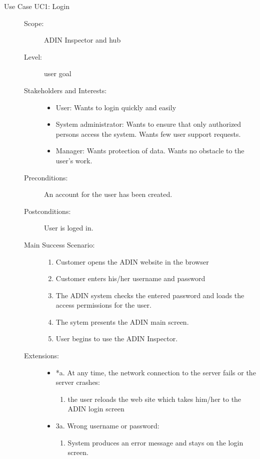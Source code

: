 \documentclass[twoside, english, draft]{Pflichtenheft}
\begin{document}
\begin{description}
\item[Use Case UC1: Login]
\hfill
\begin{description}
\item[Scope:] ADIN Inspector and hub
\item[Level:] user goal
\item[Stakeholders and Interests:]
\hfill
\begin{itemize}
\item{User: Wants to login quickly and easily}
\item{System administrator: Wants to ensure that only authorized persons access the system. Wants few user support requests.}
\item{Manager: Wants protection of data. Wants no obstacle to the user's work.}
\end{itemize}
\item[Preconditions:] An account for the user has been created.
\item[Postconditions:] User is loged in.
\item[Main Success Scenario:]
\hfill
\begin{enumerate}
\item{Customer opens the ADIN website in the browser}
\item{Customer enters his/her username and password}
\item{The ADIN system checks the entered password and loads the access permissions for the user.}
\item{The sytem presents the ADIN main screen.}
\item{User begins to use the ADIN Inspector.}
\end{enumerate}

\item[Extensions:]
\hfill
\begin{itemize}
\item[]*a. At any time, the network connection to the server fails or the server crashes:
\begin{enumerate}
\item{the user reloads the web site which takes him/her to the ADIN login screen}
\end{enumerate}

\item[]3a. Wrong username or password:
\begin{enumerate}
\item{System produces an error message and stays on the login screen.}
\end{enumerate}


\end{itemize}
\end{description}
\end{description}
\end{document}

